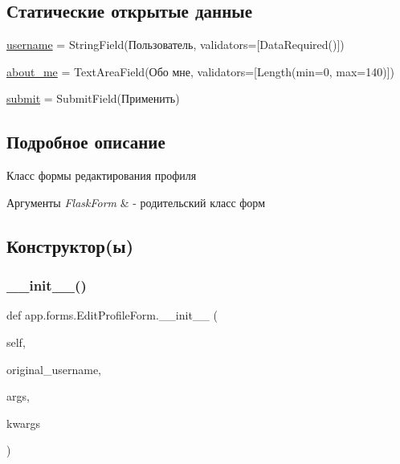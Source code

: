 \subsection*{Статические открытые данные}
\begin{DoxyCompactItemize}
\item 
\mbox{\hyperlink{classapp_1_1forms_1_1_edit_profile_form_a57b60e620c9d09de0968b3e456039612}{username}} = String\+Field(\textquotesingle{}Пользователь\textquotesingle{}, validators=\mbox{[}Data\+Required()\mbox{]})
\item 
\mbox{\hyperlink{classapp_1_1forms_1_1_edit_profile_form_ab4d1bb9524c5cbcf8326f4df8888d24f}{about\+\_\+me}} = Text\+Area\+Field(\textquotesingle{}Обо мне\textquotesingle{}, validators=\mbox{[}Length(min=0, max=140)\mbox{]})
\item 
\mbox{\hyperlink{classapp_1_1forms_1_1_edit_profile_form_a75092e1817f3b7a852be060458dc1ba5}{submit}} = Submit\+Field(\textquotesingle{}Применить\textquotesingle{})
\end{DoxyCompactItemize}


\subsection{Подробное описание}
Класс формы редактирования профиля 


\begin{DoxyParams}{Аргументы}
{\em Flask\+Form} & -\/ родительский класс форм \\
\hline
\end{DoxyParams}


\subsection{Конструктор(ы)}
\mbox{\label{classapp_1_1forms_1_1_edit_profile_form_ac6fcb8c475148a0190fe489e61e33101}} 
\subsubsection{\texorpdfstring{\+\_\+\+\_\+init\+\_\+\+\_\+()}{\_\_init\_\_()}}
{\footnotesize\ttfamily def app.\+forms.\+Edit\+Profile\+Form.\+\_\+\+\_\+init\+\_\+\+\_\+ (\begin{DoxyParamCaption}\item[{}]{self,  }\item[{}]{original\+\_\+username,  }\item[{}]{args,  }\item[{}]{kwargs }\end{DoxyParamCaption})}



